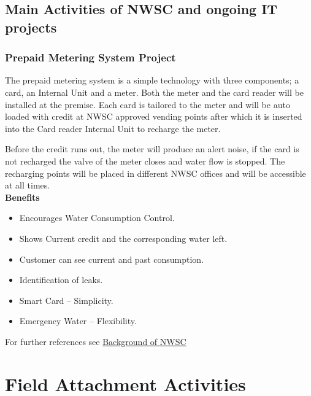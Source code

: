 \documentclass{article}
\begin{document}
\subsection{Main Activities of NWSC and ongoing IT projects}
\subsubsection{Prepaid Metering System Project}
The prepaid metering system is a simple technology with three components; a card, an Internal Unit and a meter. Both the meter and the card reader will be installed at the premise. Each card is tailored to the meter and will be auto loaded with credit at NWSC approved vending points after which it is inserted into the Card reader Internal Unit to recharge the meter.
\par Before the credit runs out, the meter will produce an alert noise, if the card is not recharged the valve of the meter closes and water flow is stopped. The recharging points will be placed in different NWSC offices and will be accessible at all times.\\
\textbf{Benefits}
\begin{itemize}
\item Encourages Water Consumption Control.
\item Shows Current credit and the corresponding water left.
\item Customer can see current and past consumption.
\item Identification of leaks.
\item Smart Card – Simplicity.
\item Emergency Water – Flexibility.
\end{itemize}
For further references see \href{https://www.nwsc.co.ug/index.php/about-us}{Background of NWSC} 
\newpage
\section{Field Attachment Activities}
\end{document}
